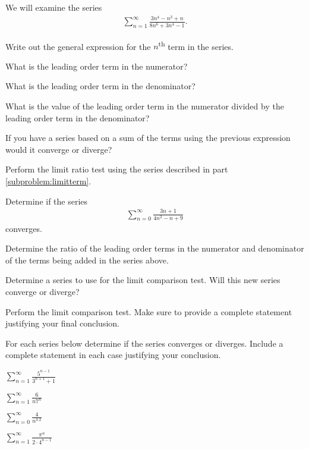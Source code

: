 \begin{problem}
  \item We will examine the series
  \begin{eqnarray*}
    \sum^\infty_{n=1} \frac{3n^4 - n^3 + n}{8n^6 + 3n^4 - 1}.
  \end{eqnarray*}
  \begin{subproblem}
      \item Write out the general expression for the $n$\textsuperscript{th} term in the series.
      \vfill
      \item What is the leading order term in the numerator?
      \vfill
      \item What is the leading order term in the denominator?
      \vfill
      \item What is the value of the leading order term in the numerator divided by the leading order term in the denominator?
      \vfill
      \clearpage
      \item If you have a series based on a sum of the terms using the previous expression would it converge or diverge?
      \label{subproblem:limitterm}
      \vfill
      \item Perform the limit ratio test using the series described in part \ref{subproblem:limitterm}.
      \vfill
      \vfill
      \vfill
  \end{subproblem}
  \clearpage
  \item Determine if the series
  \begin{eqnarray*}
    \sum^\infty_{n=0} \frac{3n+1}{4n^2-n+9}
  \end{eqnarray*}
  converges.
  \begin{subproblem}
    \item  Determine the ratio of the leading order terms in the numerator and denominator of the terms being added in the series above.
    \vfill
    \item Determine a series to use for the limit comparison test. Will this new series converge or diverge?
    \vfill
    \item Perform the limit comparison test.  Make sure to provide a complete statement justifying your final conclusion.
    \vfill
    \vfill
    \vfill
  \end{subproblem}

  \clearpage

\item For each series below determine if the series converges or diverges. Include a complete statement in each case justifying your conclusion.
  \begin{subproblem}
    \item $\sum_{n=1}^\infty \frac{5^{n-1}}{3^{n+1}+1}$
      \vfill
    \item $\sum_{n=1}^\infty \frac{6}{n7^n}$
      \vfill
      \clearpage
    \item $\sum_{n=0}^\infty \frac{4}{n^{3.2}} $
      \vfill
    \item $\sum_{n=1}^\infty \frac{\pi^n}{2\cdot 4^{n-1}}$
      \vfill
      \clearpage
  \end{subproblem}
\end{problem}


